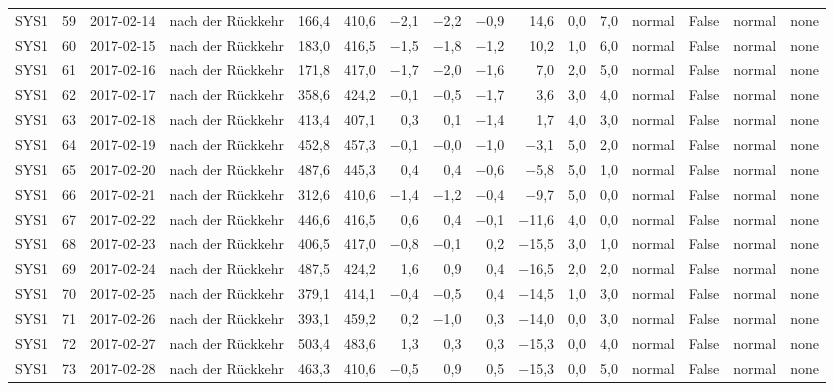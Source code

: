 \begin{tabular}{lrllrrrrrrrrlrll}
SYS1 & 59 & 2017-02-14 & nach der Rückkehr & 166,4 & 410,6 & $-$2,1 & $-$2,2 & $-$0,9 & 14,6 & 0,0 & 7,0 & normal & False & normal & none \\
SYS1 & 60 & 2017-02-15 & nach der Rückkehr & 183,0 & 416,5 & $-$1,5 & $-$1,8 & $-$1,2 & 10,2 & 1,0 & 6,0 & normal & False & normal & none \\
SYS1 & 61 & 2017-02-16 & nach der Rückkehr & 171,8 & 417,0 & $-$1,7 & $-$2,0 & $-$1,6 & 7,0 & 2,0 & 5,0 & normal & False & normal & none \\
SYS1 & 62 & 2017-02-17 & nach der Rückkehr & 358,6 & 424,2 & $-$0,1 & $-$0,5 & $-$1,7 & 3,6 & 3,0 & 4,0 & normal & False & normal & none \\
SYS1 & 63 & 2017-02-18 & nach der Rückkehr & 413,4 & 407,1 & 0,3 & 0,1 & $-$1,4 & 1,7 & 4,0 & 3,0 & normal & False & normal & none \\
SYS1 & 64 & 2017-02-19 & nach der Rückkehr & 452,8 & 457,3 & $-$0,1 & $-$0,0 & $-$1,0 & $-$3,1 & 5,0 & 2,0 & normal & False & normal & none \\
SYS1 & 65 & 2017-02-20 & nach der Rückkehr & 487,6 & 445,3 & 0,4 & 0,4 & $-$0,6 & $-$5,8 & 5,0 & 1,0 & normal & False & normal & none \\
SYS1 & 66 & 2017-02-21 & nach der Rückkehr & 312,6 & 410,6 & $-$1,4 & $-$1,2 & $-$0,4 & $-$9,7 & 5,0 & 0,0 & normal & False & normal & none \\
SYS1 & 67 & 2017-02-22 & nach der Rückkehr & 446,6 & 416,5 & 0,6 & 0,4 & $-$0,1 & $-$11,6 & 4,0 & 0,0 & normal & False & normal & none \\
SYS1 & 68 & 2017-02-23 & nach der Rückkehr & 406,5 & 417,0 & $-$0,8 & $-$0,1 & 0,2 & $-$15,5 & 3,0 & 1,0 & normal & False & normal & none \\
SYS1 & 69 & 2017-02-24 & nach der Rückkehr & 487,5 & 424,2 & 1,6 & 0,9 & 0,4 & $-$16,5 & 2,0 & 2,0 & normal & False & normal & none \\
SYS1 & 70 & 2017-02-25 & nach der Rückkehr & 379,1 & 414,1 & $-$0,4 & $-$0,5 & 0,4 & $-$14,5 & 1,0 & 3,0 & normal & False & normal & none \\
SYS1 & 71 & 2017-02-26 & nach der Rückkehr & 393,1 & 459,2 & 0,2 & $-$1,0 & 0,3 & $-$14,0 & 0,0 & 3,0 & normal & False & normal & none \\
SYS1 & 72 & 2017-02-27 & nach der Rückkehr & 503,4 & 483,6 & 1,3 & 0,3 & 0,3 & $-$15,3 & 0,0 & 4,0 & normal & False & normal & none \\
SYS1 & 73 & 2017-02-28 & nach der Rückkehr & 463,3 & 410,6 & $-$0,5 & 0,9 & 0,5 & $-$15,3 & 0,0 & 5,0 & normal & False & normal & none \\

\end{tabular}
